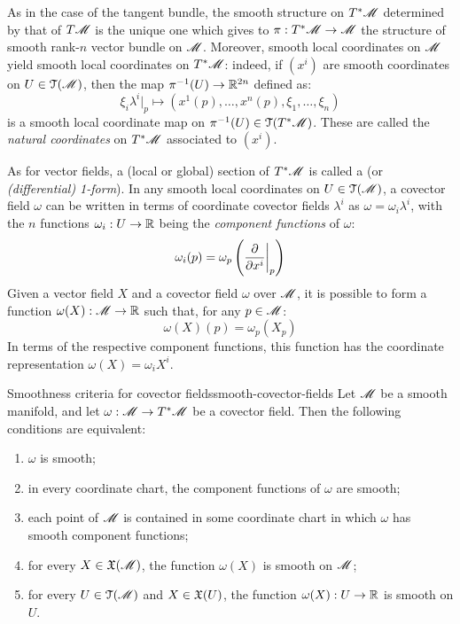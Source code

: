 As in the case of the tangent bundle, the smooth structure on $ T^*\mathscr{M} $ determined by that of $ T\mathscr{M} $ is the unique one which gives to $ \pi : T^*\mathscr{M} \rightarrow \mathscr{M} $ the structure of smooth rank-$ n $ vector bundle on $ \mathscr{M} $. Moreover, smooth local coordinates on $ \mathscr{M} $ yield smooth local coordinates on $ T^*\mathscr{M} $: indeed, if $ (x^i) $ are smooth coordinates on $ U \in \EuScript{T}(\mathscr{M}) $, then the map $ \pi^{-1}(U) \rightarrow \mathbb{R}^{2n} $ defined as:
\begin{equation}
  \xi_i \lambda^i \vert_p \mapsto (x^1(p) , \dots , x^n(p) , \xi_1 , \dots , \xi_n)
\end{equation}
is a smooth local coordinate map on $ \pi^{-1}(U) \in \EuScript{T}(T^*\mathscr{M}) $. These are called the \emph{natural coordinates} on $ T^*\mathscr{M} $ associated to $ (x^i) $.

As for vector fields, a (local or global) section of $ T^*\mathscr{M} $ is called a  (or \emph{(differential) 1-form}). In any smooth local coordinates on $ U \in \EuScript{T}(\mathscr{M}) $, a covector field $ \omega $ can be written in terms of coordinate covector fields $ \lambda^i $ as $ \omega = \omega_i \lambda^i $, with the $ n $ functions $ \omega_i : U \rightarrow \mathbb{R} $ being the \emph{component functions} of $ \omega $:
\begin{equation*}
  \omega_i(p) = \omega_p \left( \frac{\partial}{\partial x^i} \bigg\vert_p \right)
\end{equation*}
Given a vector field $ X $ and a covector field $ \omega $ over $ \mathscr{M} $, it is possible to form a function $ \omega(X) : \mathscr{M} \rightarrow \mathbb{R} $ such that, for any $ p \in \mathscr{M} $:
\begin{equation}
  \omega(X)(p) = \omega_p(X_p)
\end{equation}
In terms of the respective component functions, this function has the coordinate representation $ \omega(X) = \omega_i X^i $.

\begin{lemma}{Smoothness criteria for covector fields}{smooth-covector-fields}
  Let $ \mathscr{M} $ be a smooth manifold, and let $ \omega : \mathscr{M} \rightarrow T^*\mathscr{M} $ be a covector field. Then the following conditions are equivalent:
  \begin{enumerate}
    \item \label{item:sccf-1} $ \omega $ is smooth;
    \item \label{item:sccf-2} in every coordinate chart, the component functions of $ \omega $ are smooth;
    \item \label{item:sccf-3} each point of $ \mathscr{M} $ is contained in some coordinate chart in which $ \omega $ has smooth component functions;
    \item \label{item:sccf-4} for every $ X \in \mathfrak{X}(\mathscr{M}) $, the function $ \omega(X) $ is smooth on $ \mathscr{M} $;
    \item \label{item:sccf-5} for every $ U \in \EuScript{T}(\mathscr{M}) $ and $ X \in \mathfrak{X}(U) $, the function $ \omega(X) : U \rightarrow \mathbb{R} $ is smooth on $ U $.
  \end{enumerate}
\end{lemma}

